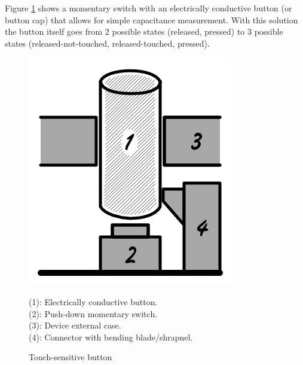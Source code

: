 \documentclass[10pt, twocolumn, a4paper]{article}
\begin{document}
    Figure \ref{fig_B1} shows a momentary switch with an electrically conductive button (or button cap) that allows for simple capacitance measurement. With this solution the button itself goes from 2 possible states (released, pressed) to 3 possible states (released-not-touched, released-touched, pressed).
    \begin{figure}[H]
        \begin{center}
            \includegraphics[width=0.4\linewidth]{figure_B1.png}
            \caption{Touch-sensitive button\\}
            \label{fig_B1}
            \small
                \vspace{2mm}
                (1): Electrically conductive button.\\
                (2): Push-down momentary switch.\\
                (3): Device external case.\\
                (4): Connector with bending blade/shrapnel.
        \end{center}
    \end{figure}
\end{document}
